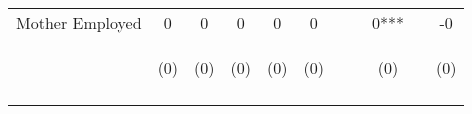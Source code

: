 \begin{tabular}{lcccccccccc}
\noalign{\smallskip}Mother Employed & 0 & 0 & 0 & 0 & 0 &  &  & 0*** &  & -0\\
 & \begin{footnotesize}(0)\end{footnotesize} & \begin{footnotesize}(0)\end{footnotesize} & \begin{footnotesize}(0)\end{footnotesize} & \begin{footnotesize}(0)\end{footnotesize} & \begin{footnotesize}(0)\end{footnotesize} & \begin{footnotesize}\end{footnotesize} & \begin{footnotesize}\end{footnotesize} & \begin{footnotesize}(0)\end{footnotesize} & \begin{footnotesize}\end{footnotesize} & \begin{footnotesize}(0)\end{footnotesize}\\
\noalign{\smallskip}\hline\end{tabular}\\
